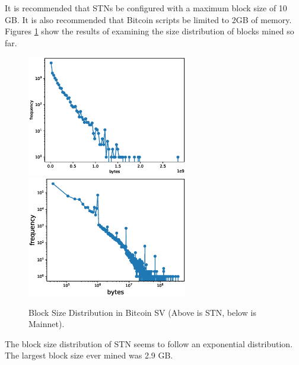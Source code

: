 \documentclass[graybox]{svmult}
\begin{document}
It is recommended that STNs be configured with a maximum block size of 10 GB.
It is also recommended that Bitcoin scripts be limited to 2GB of memory.
Figures \ref{fig:block_size} show the results of examining the size distribution of blocks mined so far.
%
\begin{figure}[t]
  \vspace{-35mm}
  \begin{center}
    \includegraphics[width=70mm]{bsv_stn-block_bytes-semilogy2.eps}
    \includegraphics[width=70mm]{bsv_mainnet-block_bytes-loglog.eps}
  \end{center}
  \vspace{35mm}
  \caption{Block Size Distribution in Bitcoin SV (Above is STN, below is Mainnet).}
  \label{fig:block_size}
\end{figure}
%
The block size distribution of STN seems to follow an exponential distribution.
The largest block size ever mined was 2.9 GB.
\end{document}
